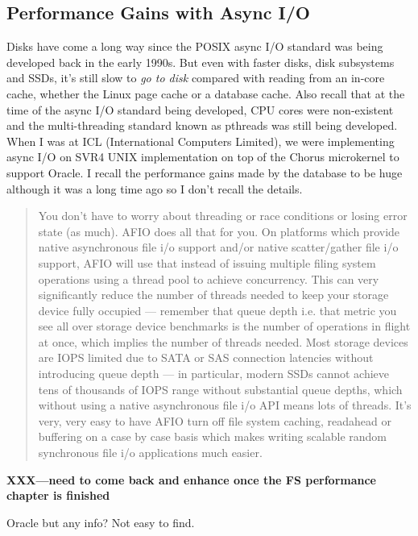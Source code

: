 
\subsection{Performance Gains with Async I/O}

Disks have come a long way since the POSIX async I/O standard was being developed back in the early 1990s. But even with  faster disks, disk subsystems and SSDs, it's still slow to \textit{go to disk} compared with reading from an in-core cache, whether the Linux page cache or a database cache. Also recall that at the time of the async I/O standard being developed, CPU cores were non-existent and the multi-threading standard known as pthreads was still being developed. When I was at ICL (International Computers Limited), we were implementing async I/O on SVR4 UNIX implementation on top of the Chorus microkernel to support Oracle. I recall the performance gains made by the database to be huge although it was a long time ago so I don't recall the details.

\begin{quote}
You don't have to worry about threading or race conditions or losing error state (as much). AFIO does all that for you.
On platforms which provide native asynchronous file i/o support and/or native scatter/gather file i/o support, AFIO will use that instead of issuing multiple filing system operations using a thread pool to achieve concurrency. This can very significantly reduce the number of threads needed to keep your storage device fully occupied — remember that queue depth i.e. that metric you see all over storage device benchmarks is the number of operations in flight at once, which implies the number of threads needed. Most storage devices are IOPS limited due to SATA or SAS connection latencies without introducing queue depth — in particular, modern SSDs cannot achieve tens of thousands of IOPS range without substantial queue depths, which without using a native asynchronous file i/o API means lots of threads.
It's very, very easy to have AFIO turn off file system caching, readahead or buffering on a case by case basis which makes writing scalable random synchronous file i/o applications much easier.
\end{quote}

\textbf{XXX---need to come back and enhance once the FS performance chapter is finished}

Oracle but any info? Not easy to find.

